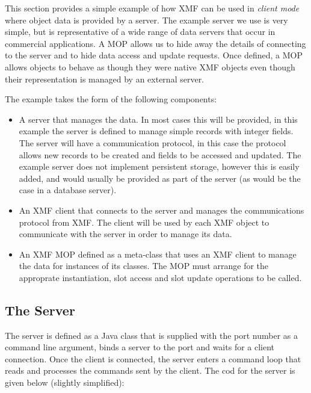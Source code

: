 \documentclass{article}
\begin{document}
This section provides a simple example of how XMF can be used in {\em client mode} 
where object data is provided by a server. The example server we use is very 
simple, but is representative of a wide range of data servers that occur in
commercial applications. A MOP allows us to hide away the details of connecting to
the server and to hide data access and update requests. Once defined, a MOP
allows objects to behave as though they were native XMF objects even though
their representation is managed by an external server. 

The example takes the form of the following components:
\begin{itemize}
\item A server that manages the data. In most cases this will be provided,
in this example the server is defined to manage simple records with integer 
fields. The server will have a communication protocol, in this case the
protocol allows new records to be created and fields to be accessed and
updated. The example server does not implement persistent storage, however
this is easily added, and would usually be provided as part of the
server (as would be the case in a database server).
\item An XMF client that connects to the server and manages the communications
protocol from XMF. The client will be used by each XMF object to communicate with
the server in order to manage its data.
\item An XMF MOP defined as a meta-class that uses an XMF client to manage the
data for instances of its classes. The MOP must arrange for the approprate
instantiation, slot access and slot update operations to be called.
\end{itemize}

\subsection{The Server}

The server is defined as a Java class that is supplied with the port number as
a command line argument, binds a server to the port and waits for a client
connection. Once the client is connected, the server enters a command loop that
reads and processes the commands sent by the client. The cod for the server is
given below (slightly simplified):
\end{document}
